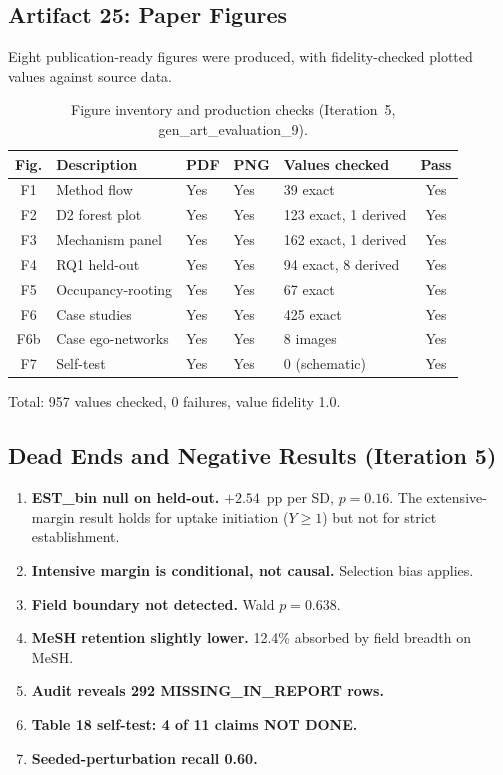\documentclass[11pt,letterpaper]{article}
\begin{document}
\subsection{Artifact 25: Paper Figures}

Eight publication-ready figures were produced, with fidelity-checked plotted values against source data.

\begin{table}[!htbp]
\centering
\caption{Figure inventory and production checks (Iteration~5, gen\_art\_evaluation\_9).}
\label{tab:figures}
{\small
\begin{tabular}{clR{1.2cm}R{1.2cm}R{1.8cm}c}
\toprule
Fig. & Description & PDF & PNG & Values checked & Pass \\
\midrule
F1 & Method flow & Yes & Yes & 39 exact & Yes \\
F2 & D2 forest plot & Yes & Yes & 123 exact, 1 derived & Yes \\
F3 & Mechanism panel & Yes & Yes & 162 exact, 1 derived & Yes \\
F4 & RQ1 held-out & Yes & Yes & 94 exact, 8 derived & Yes \\
F5 & Occupancy-rooting & Yes & Yes & 67 exact & Yes \\
F6 & Case studies & Yes & Yes & 425 exact & Yes \\
F6b & Case ego-networks & Yes & Yes & 8 images & Yes \\
F7 & Self-test & Yes & Yes & 0 (schematic) & Yes \\
\bottomrule
\end{tabular}
}
\end{table}

Total: 957 values checked, 0 failures, value fidelity 1.0.

\subsection{Dead Ends and Negative Results (Iteration 5)}

\begin{enumerate}
\item \textbf{EST\_bin null on held-out.} $+2.54$~pp per SD, $p = 0.16$. The extensive-margin result holds for uptake initiation ($Y \geq 1$) but not for strict establishment.
\item \textbf{Intensive margin is conditional, not causal.} Selection bias applies.
\item \textbf{Field boundary not detected.} Wald $p = 0.638$.
\item \textbf{MeSH retention slightly lower.} 12.4\% absorbed by field breadth on MeSH.
\item \textbf{Audit reveals 292 MISSING\_IN\_REPORT rows.}
\item \textbf{Table 18 self-test: 4 of 11 claims NOT DONE.}
\item \textbf{Seeded-perturbation recall 0.60.}
\end{enumerate}
\end{document}

